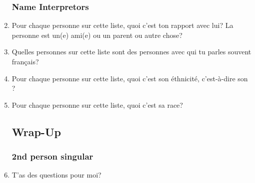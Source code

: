 \begin{enumerate}
    \subsubsection{Name Interpretors}
    \item Pour chaque personne sur cette liste, quoi c'est ton rapport avec lui? La personne est un(e) ami(e) ou un parent ou autre chose?\\
    \item Quelles personnes sur cette liste sont des personnes avec qui tu parles souvent français?\\
    \item Pour chaque personne sur cette liste, quoi c'est son éthnicité, c'est-à-dire son ?\\
    \item Pour chaque personne sur cette liste, quoi c'est sa race?\\
  \subsection{Wrap-Up}
    \subsubsection{2nd person singular}
      \item T'as des questions pour moi?
\end{enumerate}
